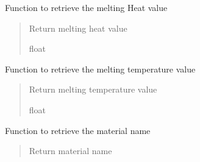\documentclass[letterpaper,10pt,english]{sphinxmanual}
\begin{document}
\begin{fulllineitems}

\begin{fulllineitems}
\label{\detokenize{modules:material.Material.material_meltingHeat}}
\pysigstartsignatures
{}
\pysigstopsignatures
\sphinxAtStartPar
Function to retrieve the melting Heat value
\begin{quote}\begin{description}
\sphinxAtStartPar
{} \textendash{} Return melting heat value

\sphinxAtStartPar
float

\end{description}\end{quote}

\end{fulllineitems}


\begin{fulllineitems}
\label{\detokenize{modules:material.Material.material_meltingTemperature}}
\pysigstartsignatures
{}
\pysigstopsignatures
\sphinxAtStartPar
Function to retrieve the melting temperature value
\begin{quote}\begin{description}
\sphinxAtStartPar
{} \textendash{} Return melting temperature value

\sphinxAtStartPar
float

\end{description}\end{quote}

\end{fulllineitems}


\begin{fulllineitems}
\label{\detokenize{modules:material.Material.material_name}}
\pysigstartsignatures
{}
\pysigstopsignatures
\sphinxAtStartPar
Function to retrieve the material name
\begin{quote}\begin{description}
\sphinxAtStartPar
{} \textendash{} Return material name


\end{description}
\end{quote}
\end{fulllineitems}
\end{fulllineitems}
\end{document}
